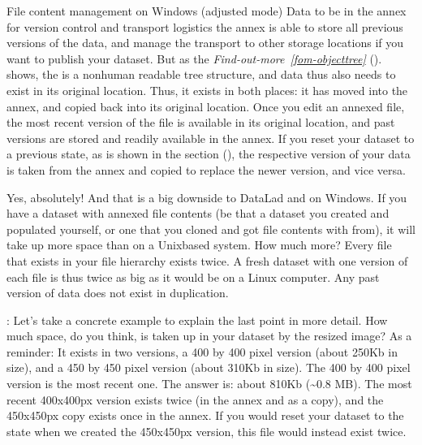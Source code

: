 \begin{windowswit}[label={ww-adjusted-mode}, before title={\thetcbcounter\ }, float, floatplacement=tbp, check odd page=true]{File content management on Windows (adjusted mode)}
\sphinxAtStartPar
{}
Data  to be in the annex for version control and transport logistics \textendash{} the annex is able to store all previous versions of the data, and manage the transport to other storage locations if you want to publish your dataset.
But as the
\textit{Find-out-more}~{\findoutmoreiconinline}\textit{\ref{fom-objecttree}} {\hyperref[\detokenize{basics/101-115-symlinks:fom-objecttree}]{}} ().
shows, the {\hyperref[\detokenize{glossary:term-annex}]{}} is a non\sphinxhyphen{}human readable tree structure, and data thus also needs to exist in its original location.
Thus, it exists in both places: it has moved into the annex, and copied back into its original location.
Once you edit an annexed file, the most recent version of the file is available in its original location, and past versions are stored and readily available in the annex.
If you reset your dataset to a previous state, as is shown in the section {\hyperref[\detokenize{basics/101-137-history:history}]{}} (), the respective version of your data is taken from the annex and copied to replace the newer version, and vice versa.

\sphinxAtStartPar
{}
Yes, absolutely!
And that is a big downside to DataLad and {\hyperref[\detokenize{glossary:term-git-annex}]{}} on Windows.
If you have a dataset with annexed file contents (be that a dataset you created and populated yourself, or one that you cloned and got file contents with  from), it will take up more space than on a Unix\sphinxhyphen{}based system.
How much more?
Every file that exists in your file hierarchy exists twice.
A fresh dataset with one version of each file is thus twice as big as it would be on a Linux computer.
Any past version of data does not exist in duplication.

\sphinxAtStartPar
{}:
Let’s take a concrete example to explain the last point in more detail.
How much space, do you think, is taken up in your dataset by the resized  image?
As a reminder: It exists in two versions, a 400 by 400 pixel version (about 250Kb in size), and a 450 by 450 pixel version (about 310Kb in size).
The 400 by 400 pixel version is the most recent one.
The answer is: about 810Kb (\textasciitilde{}0.8 MB).
The most recent 400x400px version exists twice (in the annex and as a copy), and the 450x450px copy exists once in the annex.
If you would reset your dataset to the state when we created the 450x450px version, this file would instead exist twice.


\end{windowswit}
